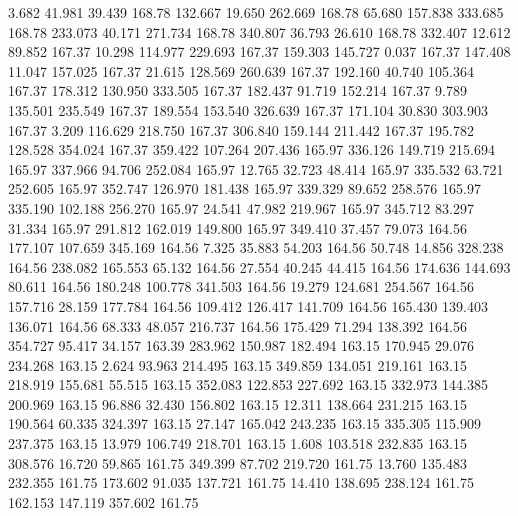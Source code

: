    3.682   41.981   39.439       168.78
 132.667   19.650  262.669       168.78
  65.680  157.838  333.685       168.78
 233.073   40.171  271.734       168.78
 340.807   36.793   26.610       168.78
 332.407   12.612   89.852       167.37
  10.298  114.977  229.693       167.37
 159.303  145.727    0.037       167.37
 147.408   11.047  157.025       167.37
  21.615  128.569  260.639       167.37
 192.160   40.740  105.364       167.37
 178.312  130.950  333.505       167.37
 182.437   91.719  152.214       167.37
   9.789  135.501  235.549       167.37
 189.554  153.540  326.639       167.37
 171.104   30.830  303.903       167.37
   3.209  116.629  218.750       167.37
 306.840  159.144  211.442       167.37
 195.782  128.528  354.024       167.37
 359.422  107.264  207.436       165.97
 336.126  149.719  215.694       165.97
 337.966   94.706  252.084       165.97
  12.765   32.723   48.414       165.97
 335.532   63.721  252.605       165.97
 352.747  126.970  181.438       165.97
 339.329   89.652  258.576       165.97
 335.190  102.188  256.270       165.97
  24.541   47.982  219.967       165.97
 345.712   83.297   31.334       165.97
 291.812  162.019  149.800       165.97
 349.410   37.457   79.073       164.56
 177.107  107.659  345.169       164.56
   7.325   35.883   54.203       164.56
  50.748   14.856  328.238       164.56
 238.082  165.553   65.132       164.56
  27.554   40.245   44.415       164.56
 174.636  144.693   80.611       164.56
 180.248  100.778  341.503       164.56
  19.279  124.681  254.567       164.56
 157.716   28.159  177.784       164.56
 109.412  126.417  141.709       164.56
 165.430  139.403  136.071       164.56
  68.333   48.057  216.737       164.56
 175.429   71.294  138.392       164.56
 354.727   95.417   34.157       163.39
 283.962  150.987  182.494       163.15
 170.945   29.076  234.268       163.15
   2.624   93.963  214.495       163.15
 349.859  134.051  219.161       163.15
 218.919  155.681   55.515       163.15
 352.083  122.853  227.692       163.15
 332.973  144.385  200.969       163.15
  96.886   32.430  156.802       163.15
  12.311  138.664  231.215       163.15
 190.564   60.335  324.397       163.15
  27.147  165.042  243.235       163.15
 335.305  115.909  237.375       163.15
  13.979  106.749  218.701       163.15
   1.608  103.518  232.835       163.15
 308.576   16.720   59.865       161.75
 349.399   87.702  219.720       161.75
  13.760  135.483  232.355       161.75
 173.602   91.035  137.721       161.75
  14.410  138.695  238.124       161.75
 162.153  147.119  357.602       161.75
